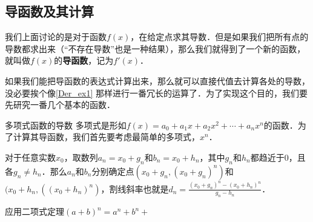 \subsection{导函数及其计算}

我们上面讨论的是对于函数$f(x)$，在给定点求其导数．但是如果我们把所有点的导数都求出来（“不存在导数”也是一种结果），那么我们就得到了一个新的函数，就叫做$f(x)$的\textbf{导函数}，记为$f'(x)$．

如果我们能把导函数的表达式计算出来，那么就可以直接代值去计算各处的导数，没必要挨个像\autoref{Der_ex1} 那样进行一番冗长的运算了．为了实现这个目的，我们要先研究一番几个基本的函数．

\begin{example}{多项式函数的导数}
多项式是形如$f(x)=a_0+a_1x+a_2x^2+\cdots+a_nx^n$的函数．为了计算其导函数，我们首先要考虑最简单的多项式，$x^n$．

对于任意实数$x_0$，取数列$a_n=x_0+g_n$和$b_n=x_0+h_n$，其中$g_n$和$h_n$都趋近于$0$，且各$g_n\not=h_n$．那么$a_n$和$b_n$分别确定点$(x_0+g_n, (x_0+g_n)^n)$和$(x_0+h_n, ((x_0+h_n)^n)$，割线斜率也就是$d_n=\frac{(x_0+g_n)^n-(x_0+h_n)^n}{g_n-h_n}$．

应用二项式定理$(a+b)^n=a^n+b^n+$
\end{example}







